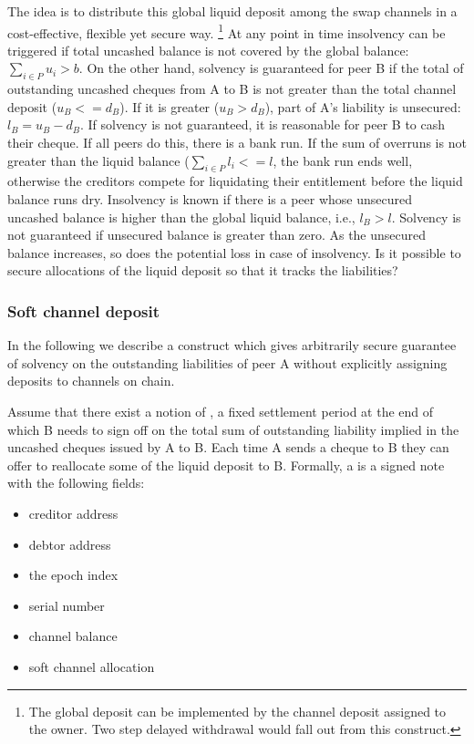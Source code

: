 


The idea is to distribute this global liquid deposit among the swap channels in a cost-effective, flexible yet secure way.%
%
\footnote{The global deposit can be implemented by the channel deposit assigned to the owner. Two step delayed withdrawal would fall out from this construct.}
%
At any point in time insolvency can be triggered if total uncashed balance is not covered by the global balance: $\sum_{i\in P}u_i > b$. On the other hand, solvency is guaranteed for peer B if the total of outstanding uncashed cheques from A to B is not greater than the total channel deposit ($u_B <= d_B$). If it is greater ($u_B > d_B$), part of A's liability is unsecured: $l_B = u_B - d_B$. If solvency is not guaranteed, it is reasonable for peer B to cash their cheque. If all peers do this, there is a bank run. If the sum of overruns is not greater than the liquid balance ($\sum_{i\in P}l_i <= l$, the bank run ends well, otherwise the creditors compete for liquidating their entitlement before the liquid balance runs dry. 
Insolvency is known if there is a peer whose unsecured uncashed balance is higher than the global liquid balance, i.e., $l_B > l$.
Solvency is not guaranteed if unsecured balance is greater than zero. As the unsecured balance increases, so does the potential loss in case of insolvency. Is it possible to secure allocations of the liquid deposit so that it tracks the liabilities? 

\subsubsection{Soft channel deposit}

In the following we describe a construct which gives arbitrarily secure guarantee of solvency on the outstanding liabilities of peer A without explicitly assigning deposits to channels on chain.

Assume that there exist a notion of , a fixed settlement period at the end of which B needs to sign off on the total sum of outstanding liability implied in the uncashed cheques issued by A to B.
Each time A sends a cheque to B they can offer to reallocate some of the liquid deposit to B.
Formally, a  is a signed note with the following fields:

\begin{itemize}
  \item creditor address
  \item debtor address
  \item the epoch index
  \item serial number
  \item channel balance
  \item soft channel allocation
\end{itemize}


